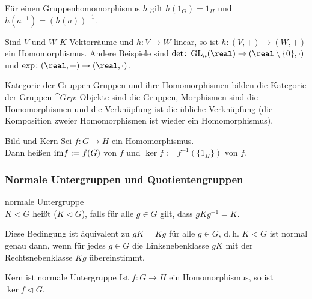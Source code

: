 \begin{Bem}
    Für einen Gruppenhomomorphismus $h$ gilt $h(1_G) = 1_H$ und
    $h(a^{-1}) = (h(a))^{-1}$.
\end{Bem}

\begin{Bsp}
    Sind $V$ und $W$ $K$-Vektorräume und $h\colon V \rightarrow W$ linear,
    so ist $h\colon (V, +) \rightarrow (W, +)$ ein Homomorphismus.
    Andere Beispiele sind
    $\det\colon \GL_n(\real) \rightarrow (\real \setminus \{0\}, \cdot)$ und
    $\exp\colon (\real, +) \rightarrow (\real, \cdot)$.
\end{Bsp}

\begin{Def}{Kategorie der Gruppen}
    Gruppen und ihre Homomorphismen bilden die Kategorie der Gruppen
    $\cat{Grp}$:
    Objekte sind die Gruppen, Morphismen sind die Homomorphismen und
    die Verknüpfung ist die übliche Verknüpfung (die Komposition zweier
    Homomorphismen ist wieder ein Homomorphismus).
\end{Def}

\linie

\begin{Def}{Bild und Kern}
    Sei $f\colon G \rightarrow H$ ein Homomorphismus. \\
    Dann heißen $\text{im} f := f(G)$  von $f$ und
    $\ker f := f^{-1}(\{1_H\})$  von $f$.
\end{Def}

\subsubsection{%
    Normale Untergruppen und Quotientengruppen%
}

\begin{Def}{normale Untergruppe}\\
    $K < G$ heißt  ($K \vartriangleleft G$), falls
    für alle $g \in G$ gilt, dass $gKg^{-1} = K$.
\end{Def}

\begin{Bem}
    Diese Bedingung ist äquivalent zu $gK = Kg$ für alle $g \in G$, d.\,h.
    $K < G$ ist normal genau dann, wenn für jedes $g \in G$ die
    Linksnebenklasse $gK$ mit der Rechtsnebenklasse $Kg$ übereinstimmt.
\end{Bem}

\begin{Satz}{Kern ist normale Untergruppe}
    Ist $f\colon G \rightarrow H$ ein Homomorphismus, so ist
    $\ker f \vartriangleleft G$.
\end{Satz}


